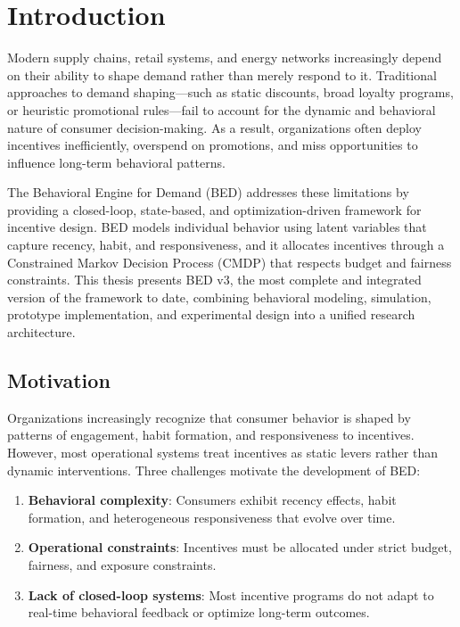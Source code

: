 \chapter{Introduction}

Modern supply chains, retail systems, and energy networks increasingly depend on
their ability to shape demand rather than merely respond to it. Traditional
approaches to demand shaping—such as static discounts, broad loyalty programs,
or heuristic promotional rules—fail to account for the dynamic and behavioral
nature of consumer decision-making. As a result, organizations often deploy
incentives inefficiently, overspend on promotions, and miss opportunities to
influence long-term behavioral patterns.

The Behavioral Engine for Demand (BED) addresses these limitations by providing
a closed-loop, state-based, and optimization-driven framework for incentive
design. BED models individual behavior using latent variables that capture
recency, habit, and responsiveness, and it allocates incentives through a
Constrained Markov Decision Process (CMDP) that respects budget and fairness
constraints. This thesis presents BED v3, the most complete and integrated
version of the framework to date, combining behavioral modeling, simulation,
prototype implementation, and experimental design into a unified research
architecture.

\section{Motivation}

Organizations increasingly recognize that consumer behavior is shaped by
patterns of engagement, habit formation, and responsiveness to incentives.
However, most operational systems treat incentives as static levers rather than
dynamic interventions. Three challenges motivate the development of BED:

\begin{enumerate}
    \item \textbf{Behavioral complexity}: Consumers exhibit recency effects,
    habit formation, and heterogeneous responsiveness that evolve over time.
    \item \textbf{Operational constraints}: Incentives must be allocated under
    strict budget, fairness, and exposure constraints.
    \item \textbf{Lack of closed-loop systems}: Most incentive programs do not
    adapt to real-time behavioral feedback or optimize long-term outcomes.
\end{enumerate}

